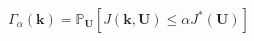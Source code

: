 \documentclass[11pt]{beamer}
\newcommand{\Prob}{\mathbb{P}}
\DeclareMathOperator*{\argmin}{arg\,min}
\begin{document}
\begin{frame}
      \begin{equation*}
        \Gamma_{\alpha}(\bm{k}) = \Prob_{\bm{U}}\left[J(\bm{k},\bm{U}) \leq \alpha J^*(\bm{U}) \right]
      \end{equation*}
   \end{frame}
\end{document}
